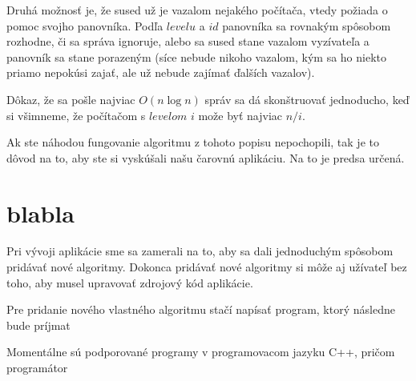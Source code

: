 Druhá možnosť je, že sused už je vazalom nejakého počítača, vtedy požiada o pomoc svojho panovníka.
Podľa $levelu$ a $id$ panovníka sa rovnakým spôsobom rozhodne, či sa správa ignoruje, alebo 
sa sused stane vazalom vyzívateľa a panovník sa stane porazeným (síce nebude nikoho vazalom, kým sa
ho niekto priamo nepokúsi zajať, ale už nebude zajímať ďalších vazalov).

Dôkaz, že sa pošle najviac $O(n\log n)$ správ sa dá skonštruovať jednoducho, keď si všimneme, 
že počítačom s $levelom$ $i$ može byť najviac $n/i$.

Ak ste náhodou fungovanie algoritmu z tohoto popisu nepochopili, tak je to dôvod na to, aby ste si vyskúšali našu
čarovnú aplikáciu. Na to je predsa určená.

\section{blabla}

Pri vývoji aplikácie sme sa zamerali na to, aby sa dali jednoduchým spôsobom pridávať nové
algoritmy. Dokonca pridávať nové algoritmy si môže aj užívateľ bez toho, aby musel upravovať 
zdrojový kód aplikácie. 



Pre pridanie nového vlastného algoritmu stačí napísať program, ktorý následne bude príjmat 

Momentálne sú podporované programy v programovacom jazyku C++, pričom
programátor

